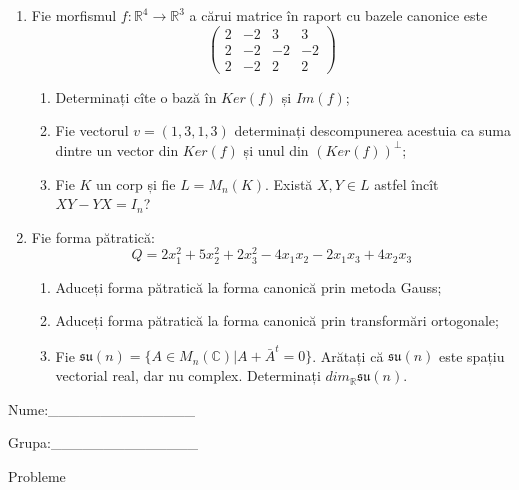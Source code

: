 \documentclass{article}
\begin{document}
\begin{enumerate}
 \item Fie morfismul $f:\mathbb{R}^4 \to \mathbb{R}^3$ a cărui matrice în raport cu bazele canonice este
$$\begin{pmatrix}
2&-2&3&3\\
2&-2&-2&-2\\
2&-2&2&2
\end{pmatrix}$$

\begin{enumerate}
\item Determinați cîte o bază în $Ker(f)$ și $Im(f)$;
\item Fie vectorul $v=(1,3,1,3)$ determinați descompunerea acestuia ca suma dintre un vector din $Ker(f)$ și unul din $(Ker(f))^\perp$;
\item Fie $K$ un corp și fie $L=M_n(K)$. Există $X,Y \in L$ astfel încît $XY-YX=I_n$?  
\end{enumerate}
\item Fie forma pătratică:
$$Q= 2x_1^2+5x_2^2+2x_3^2-4x_1x_2-2x_1x_3+4x_2x_3$$

\begin{enumerate}
\item Aduceți forma pătratică la forma canonică prin metoda Gauss;
\item Aduceți forma pătratică la forma canonică prin transformări ortogonale;
\item Fie $\mathfrak{su}(n)=\{ A \in M_n(\mathbb{C}) | A+\bar{A}^t=0\}$. Arătați că $\mathfrak{su}(n)$ este spațiu vectorial real, dar nu complex.
Determinați $dim_{\mathbb{R}}\mathfrak{su}(n)$.
\end{enumerate}
\end{enumerate}
\newpage
\begin{flushright}
Nume:\_\_\_\_\_\_\_\_\_\_\_\_\_\_
 
 
Grupa:\_\_\_\_\_\_\_\_\_\_\_\_\_\_
\end{flushright}
\begin{center}
\vspace{2cm}
{\Large Probleme}
\vspace{2cm}
\end{center}
\end{document}
